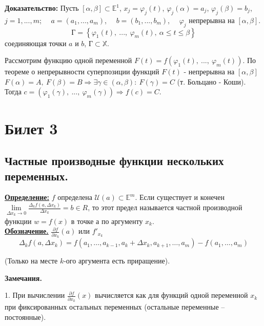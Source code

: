 \documentclass[a4paper,12pt]{article} %
\renewcommand {\leq}{\leqslant}
\begin{document}
\textbf{Доказательство:} Пусть $[\alpha, \beta] \subset \mathbb{E}^1$, $x_j = \varphi_j(t)$, $\varphi_j(\alpha) = a_j$, $\varphi_j(\beta) = b_j$, $j = 1, ..., m$;
$\quad a = (a_1, ..., a_m)$, $\quad b = (b_1, ..., b_m)$, $\quad \varphi_j$ непрерывна на $[\alpha, \beta]$.
\[\text{Г} = \left\{\varphi_1(t),~ ..., ~\varphi_m(t), ~\alpha \leq t \leq \beta \right\}\] соединяющая точки $a$ и $b$, $\text{Г} \subset \mathbb{X}$.

Рассмотрим функцию одной переменной $F(t) = f(\varphi_1(t),~ ..., ~\varphi_m(t))$. По теореме о непрерывности суперпозиции функций $F(t)$ - непрерывна на $[\alpha, \beta]$
$F(\alpha) = A, ~ F(\beta) = B \Rightarrow \exists \gamma \in (\alpha, \beta): ~ F(\gamma) = C$ (т. Больцано - Коши). 
Тогда $c = (\varphi_1(\gamma),~ ..., ~\varphi_m(\gamma)) \Rightarrow f(c) = C.$


\newpage
\section{Билет 3}
	
\subsection{Частные производные функции нескольких переменных.}  
	
\underline{\textbf{Определение:}} $f$ определена $\mathscr{U}(a) \subset \mathds{E}^m$. Если существует и конечен $\lim\limits_{\Delta{x_k}\to 0} \frac{\Delta_k f(a, \Delta{x_k})}{\Delta{x_k}}=b \in R$, то этот предел называется частной производной функции $w = f(x)$ в точке а по аргументу $x_k$.\\
	
\underline{\textbf{Обозначение.}}  $\frac{\partial f}{\partial x_k}(a)$ или $f'_{x_k}$
\[\Delta_k f(a, \Delta{x_k}) = f(a_1, \ldots, a_{k-1}, a_k + \Delta x_k, a_{k+1}, \ldots, a_m) - f(a_1, \ldots, a_m)\] 
\begin{center}
(Только на месте $k$-ого аргумента есть приращение).\\
\end{center}

\textbf{Замечания.}
	 
	1. При вычислении  $\frac{\partial f}{\partial x_k}(x)$ вычисляется как для функций одной переменной $x_k$ при фиксированных остальных переменных (остальные переменные -- постоянные).\\
	
\end{document}

